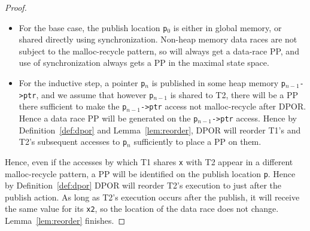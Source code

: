 \begin{proof}
\newcommand\publish[1]{{\tt p}$_{#1}$}
\begin{itemize}
	\item For the base case, the publish location \publish{0} is either in global memory, or shared directly using synchronization.
		Non-heap memory data races are not subject to the malloc-recycle pattern, so will always get a data-race PP,
		and use of synchronization always gets a PP in the maximal state space.
	\item For the inductive step, a pointer \publish{n} is published in some heap memory \publish{n-1}\texttt{->ptr},
		and we assume that however \publish{n-1} is shared to T2,
		there will be a PP there
		sufficient to make the \publish{n-1}\texttt{->ptr} access not malloc-recycle after DPOR.
		Hence a data race PP will be generated on the \publish{n-1}\texttt{->ptr} access.
		Hence by Definition~\ref{def:dpor} and Lemma~\ref{lem:reorder},
		DPOR will reorder T1's and T2's subsequent accesses to \publish{n} sufficiently to place a PP on them.
\end{itemize}

Hence, even if the accesses by which T1 shares {\tt x} with T2 appear in a different malloc-recycle pattern,
a PP will be identified on the publish location {\tt p}.
Hence by Definition~\ref{def:dpor} DPOR will reorder T2's execution to just after the publish action.
As long as T2's execution occurs after the publish, it will receive the same value for its {\tt x2}, so the location of the data race does not change.
Lemma~\ref{lem:reorder} finishes.


\end{proof}



